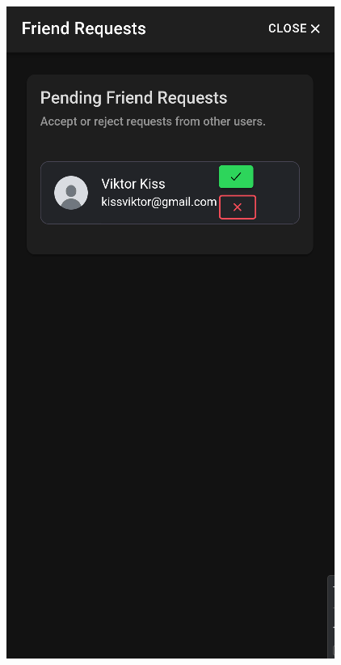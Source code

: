 \documentclass[12pt]{report}
\begin{document}
\begin{figure}[H]
    \begin{minipage}[t]{0.25\textwidth}
        \centering
        \includegraphics[width=\linewidth]{src/friendrequest4.png}
    \end{minipage}
    \hfill
    \begin{minipage}[t]{0.25\textwidth}

\end{minipage}
\end{figure}
\end{document}
